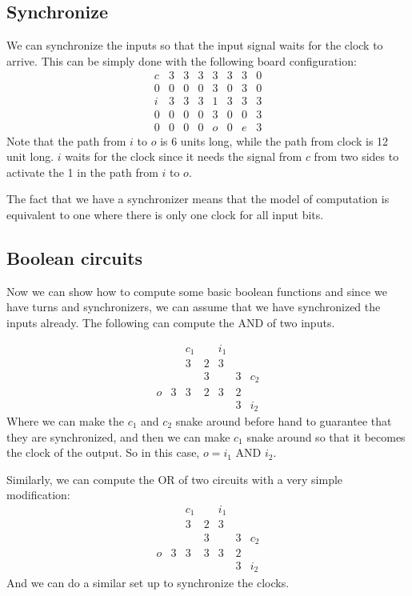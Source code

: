\documentclass[runningheads,a4paper]{llncs}
\begin{document}
\subsection{Synchronize}

We can synchronize the inputs so that the input signal waits for the clock to arrive. This can be simply done with the following board configuration:
\[ \begin{array}{cccccccc} c & 3 & 3 & 3 & 3 & 3 & 3 & 0 \\
					 0 & 0 & 0 & 0 & 3 & 0 & 3 & 0 \\
					 i  & 3 & 3 & 3 & 1 & 3 & 3 & 3 \\
					 0 & 0 & 0 & 0 & 3 & 0 & 0 & 3 \\
					 0 & 0 & 0 & 0 & o & 0 & e & 3 \end{array} \]
Note that the path from $i$ to $o$ is 6 units long, while the path from clock is 12 unit long. $i$ waits for the clock since it needs the signal from $c$ from two sides to activate the 1 in the path from $i$ to $o$.

The fact that we have a synchronizer means that the model of computation is equivalent to one where there is only one clock for all input bits. 

\subsection{Boolean circuits}

Now we can show how to compute some basic boolean functions and since we have turns and synchronizers, we can assume that we have synchronized the inputs already. The following can compute the AND of two inputs. 

\[ \begin{array}{cccccccc}    &    & c_1&   &  i_1 &     &  \\
					   &    & 3   & 2 &  3    &    &  \\
					   &    &    & 3 &    & 3 & c_2 \\
					o & 3 & 3 & 2 & 3 & 2 & 	    \\
					   &    &    &    &    & 3 & i_2 \end{array} \]
Where we can make the $c_1$ and $c_2$ snake around before hand to guarantee that they are synchronized, and then we can make $c_1$ snake around so that it becomes the clock of the output. So in this case, $o = i_1$ AND $i_2$.

Similarly, we can compute the OR of two circuits with a very simple modification:
\[ \begin{array}{cccccccc}    &    & c_1&   &  i_1 &     &  \\
					   &    & 3   & 2 &  3    &    &  \\
					   &    &    & 3 &    & 3 & c_2 \\
					o & 3 & 3 & 3 & 3 & 2 & 	    \\
					   &    &    &    &    & 3 & i_2 \end{array} \]
And we can do a similar set up to synchronize the clocks. 
\end{document}
